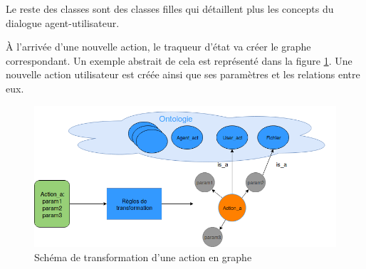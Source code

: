Le reste des classes sont des classes filles qui détaillent plus les concepts du dialogue agent-utilisateur.
\par À l'arrivée d'une nouvelle action, le traqueur d'état va créer le graphe correspondant. Un exemple abstrait de cela est représenté dans la figure \ref{abstract_onto}. Une nouvelle action utilisateur est créée ainsi que ses paramètres et les relations entre eux.
\begin{figure}[H] 
	\centering
	\includegraphics[width=0.88\linewidth]{images/Conception/DM/abstract_onto.png}
	\caption{Schéma de transformation d'une action en graphe}\label{abstract_onto}
	
\end{figure}
